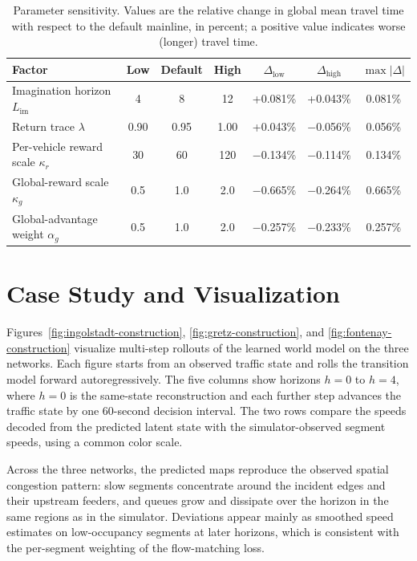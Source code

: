 \begin{table}[h]
\centering
\caption{Parameter sensitivity.
Values are the relative change in global mean travel time with respect to
the default mainline, in percent; a positive value indicates worse (longer)
travel time.}
\label{tab:parameter-sensitivity}
\renewcommand{\arraystretch}{1.0}
\scriptsize
\setlength{\tabcolsep}{3.2pt}
\begin{tabular}{lcccccc}
\toprule
Factor & Low & Default & High &
\(\Delta_{\mathrm{low}}\) &
\(\Delta_{\mathrm{high}}\) &
\(\max|\Delta|\) \\
\midrule
Imagination horizon \(L_{\mathrm{im}}\)
& 4 & 8 & 12 & +0.081\% & +0.043\% & 0.081\% \\
Return trace \(\lambda\)
& 0.90 & 0.95 & 1.00 & +0.043\% & \(-\)0.056\% & 0.056\% \\
Per-vehicle reward scale \(\kappa_r\)
& 30 & 60 & 120 & \(-\)0.134\% & \(-\)0.114\% & 0.134\% \\
Global-reward scale \(\kappa_g\)
& 0.5 & 1.0 & 2.0 & \(-\)0.665\% & \(-\)0.264\% & 0.665\% \\
Global-advantage weight \(\alpha_g\)
& 0.5 & 1.0 & 2.0 & \(-\)0.257\% & \(-\)0.233\% & 0.257\% \\
\bottomrule
\end{tabular}
\end{table}

\section{Case Study and Visualization}

Figures~\ref{fig:ingolstadt-construction}, \ref{fig:gretz-construction}, and
\ref{fig:fontenay-construction} visualize multi-step rollouts of the learned
world model on the three networks.  Each figure starts from an observed
traffic state and rolls the transition model forward autoregressively.  The
five columns show horizons \(h=0\) to \(h=4\), where \(h=0\) is the
same-state reconstruction and each further step advances the traffic state by
one 60-second decision interval.  The two rows compare the speeds decoded from the predicted latent state
with the simulator-observed segment speeds, using a common color scale.

Across the three networks, the predicted maps reproduce the observed spatial
congestion pattern: slow segments concentrate around the incident edges and
their upstream feeders, and queues grow and dissipate over the horizon in the
same regions as in the simulator.  Deviations appear mainly as smoothed speed
estimates on low-occupancy segments at later horizons, which is consistent
with the per-segment weighting of the flow-matching loss.


